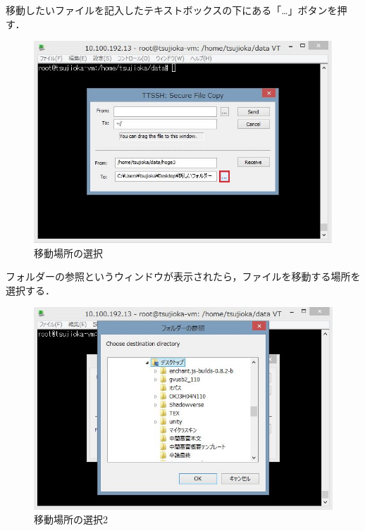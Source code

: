 \newpage

移動したいファイルを記入したテキストボックスの下にある「…」ボタンを押す．

\begin{figure}[htb]
\centering
\includegraphics[width=14cm]{sshscp3.JPG}
\caption{移動場所の選択}\label{サンプル図}
\end{figure}

\newpage

フォルダーの参照というウィンドウが表示されたら，ファイルを移動する場所を選択する．

\begin{figure}[htb]
\centering
\includegraphics[width=14cm]{sshscp4.JPG}
\caption{移動場所の選択2}\label{サンプル図}
\end{figure}

\newpage

